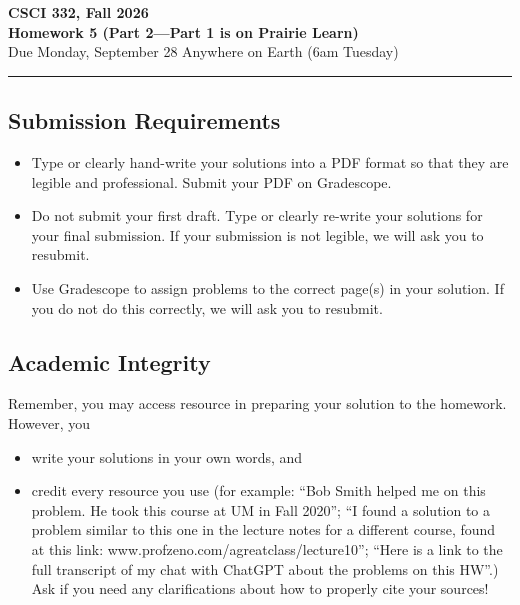 \documentclass[11pt]{article}
\begin{document}
\begin{center}
\Large\textbf{CSCI 332, Fall 2026}%
\\
\LARGE\textbf{Homework 5 (Part 2---Part 1 is on Prairie Learn)}%
\\[0.5ex]
\large Due Monday, September 28 Anywhere on Earth (6am Tuesday)
\end{center}

\bigskip
\hrule
\bigskip

\subsection*{Submission Requirements}
\begin{itemize}
    \item Type or clearly hand-write your solutions into a PDF format so that they are legible and professional. Submit your PDF on Gradescope. 
    \item Do not submit your first draft. Type or clearly re-write your solutions for your final submission. If your submission is not legible, we will ask you to resubmit.
    \item Use Gradescope to assign problems to the correct page(s) in your solution. If you do not do this correctly, we will ask you to resubmit.
\end{itemize}

\subsection*{Academic Integrity}

Remember, you may access  resource in preparing your solution to the homework. However, you 
\begin{itemize}
    \item write your solutions in your own words, and
    \item credit every resource you use (for example: ``Bob Smith helped me on
    this problem. He took this course at UM in Fall 2020''; ``I found a solution
    to a problem similar to this one in the lecture notes for a different
    course, found at this link: www.profzeno.com/agreatclass/lecture10''; ``Here is a link to the full transcript of my chat with ChatGPT about the problems on this HW''.)
    Ask if you need any clarifications about how to properly cite your sources!
\end{itemize}




\newpage
    
\end{document}

